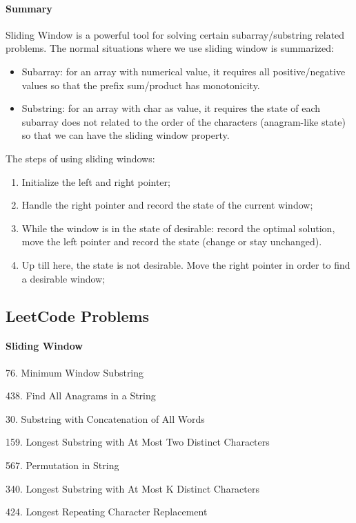 \documentclass[../searching.tex]{subfiles}
\begin{document}
\paragraph{Summary} Sliding Window is a powerful tool for solving certain subarray/substring related problems. The normal situations where we use sliding window is summarized:
\begin{itemize}
    \item Subarray: for an array with numerical value, it requires all positive/negative values so that the prefix sum/product has monotonicity. 
    \item Substring: for an array with char as value, it requires the state of each subarray does not related to the order of the characters (anagram-like state) so that we can have the sliding window property.
\end{itemize}

The steps of using sliding windows:
\begin{enumerate}
    \item Initialize the left and right pointer;
    \item Handle the right pointer and record the state of the current window;
    \item While the window is in the state of desirable: record the optimal solution, move the left pointer and record the state (change or stay unchanged).
    \item Up till here, the state is not desirable.  Move the right pointer in order to find a desirable window;
\end{enumerate}
\subsection{LeetCode Problems}
\paragraph{Sliding Window}
\begin{examples}
\item 76. Minimum Window Substring
\item 438. Find All Anagrams in a String
\item 30. Substring with Concatenation of All Words
\item 159. Longest Substring with At Most Two Distinct Characters
\item 567. Permutation in String
\item 340. Longest Substring with At Most K Distinct Characters
\item 424. Longest Repeating Character Replacement
\end{examples}
\end{document}
